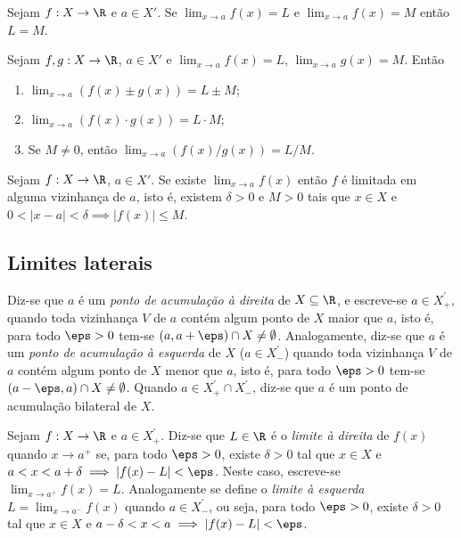 \documentclass{article}
\begin{document}
\begin{cor} 
    Sejam \(f: X \to \R\) e \(a \in X'\). Se \(\lim_{x \to a} f(x) = L\) e \(\lim_{x \to a} f(x) = M\) então \(L = M\).
\end{cor}

\begin{cor} 
    Sejam \(f, g: X \to \R\), \(a \in X'\) e \(\lim_{x \to a} f(x) = L\), \(\lim_{x \to a} g(x) = M\). Então
    \begin{enumerate}
        \item [(i)] \(\lim_{x \to a} (f(x) \pm g(x)) = L \pm M\);
        \item [(ii)] \(\lim_{x \to a} (f(x) \cdot g(x)) = L \cdot M\);
        \item [(iii)] Se \(M \neq 0\), então \(\lim_{x \to a} (f(x) / g(x)) = L / M\).
    \end{enumerate}
\end{cor}

\begin{prop}
    Sejam \(f: X \to \R\), \(a \in X'\). Se existe \(\lim_{x \to a} f(x)\) então \(f\) é limitada em alguma vizinhança de \(a\), isto é, existem \(\delta > 0\) e \(M > 0\) tais que \(x \in X\) e \(0 < |x - a| < \delta \implies |f(x)| \leq M\).
\end{prop}

\subsection{Limites laterais}

\begin{defn}
    Diz-se que \(a\) é um \emph{ponto de acumulação à direita} de \(X \subseteq \R\), e escreve-se \(a \in X_{+}^{'}\), quando toda vizinhança \(V\) de \(a\) contém algum ponto de \(X\) maior que \(a\), isto é, para todo \(\eps > 0\) tem-se \((a, a + \eps) \cap X \neq \emptyset\).
    Analogamente, diz-se que \(a\) é um \emph{ponto de acumulação à esquerda} de \(X\) (\(a \in X_{-}^{'}\)) quando toda vizinhança \(V\) de \(a\) contém algum ponto de \(X\) menor que \(a\), isto é, para todo \(\eps > 0\) tem-se \((a - \eps, a) \cap X \neq \emptyset\).
    Quando \(a \in X_{+}^{'} \cap X_{-}^{'}\), diz-se que \(a\) é um ponto de acumulação bilateral de \(X\).
\end{defn}

\begin{defn}
    Sejam \(f: X \to \R\) e \(a \in X_{+}^{'}\). Diz-se que \(L \in \R\) é o \emph{limite à direita} de \(f(x)\) quando \(x \to a^{+}\) se, para todo \(\eps > 0\), existe \(\delta > 0\) tal que \(x \in X\) e \(a < x < a + \delta \implies |f(x) - L| < \eps\). Neste caso, escreve-se \(\lim_{x \to a^{+}} f(x) = L\).
    Analogamente se define o \emph{limite à esquerda} \(L = \lim_{x \to a^{-}} f(x)\) quando \(a \in X_{-}^{'}\), ou seja, para todo \(\eps > 0\), existe \(\delta > 0\) tal que \(x \in X\) e \(a - \delta < x < a \implies |f(x) - L| < \eps\).
\end{defn}
\end{document}
